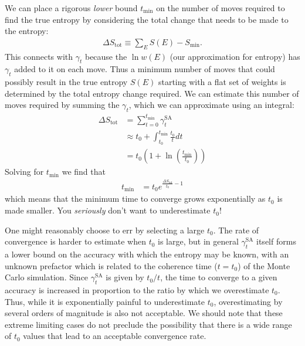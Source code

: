 \documentclass[letterpaper,twocolumn,amsmath,amssymb,pre,aps,10pt]{revtex4-1}
\begin{document}
We can place a rigorous \emph{lower} bound $t_{\min}$ on the number of
moves required to find the true entropy by considering the total change
that needs to be made to the entropy:
\begin{align}
  \Delta S_{\text{tot}} \equiv \sum_E S(E) - S_{\min}.
\end{align}
This connects with $\gamma_t$ because the $\ln w(E)$ (our approximation for entropy)
has $\gamma_t$ added to it on each move.  Thus a minimum number of moves
that could possibly result in the true entropy $S(E)$ starting with a flat set of
weights is determined by the total entropy change required.  We can estimate
this number of moves required by summing the $\gamma_t$,
which we can approximate using an integral:
\begin{align}
   \Delta S_{\text{tot}} &= \sum_{t=0}^{t_{\min}} \gamma_t^{\text{SA}} \\
  &\approx t_0 + \int_{t_0}^{t_{\min}} \frac{t_0}{t}dt
  \\
  &= t_0\left(1 + \ln\left(\frac{t_{\min}}{t_0}\right)\right)
\end{align}
Solving for ${t_{\min}}$ we find that
\begin{align}
  {t_{\min}} &= t_0 e^{\frac{\Delta S_{\text{tot}}}{t_0} - 1}
\end{align}
which means that the minimum time to converge grows exponentially
as $t_0$ is made smaller.  You \emph{seriously} don't want to underestimate
$t_0$!

One might reasonably choose to err by selecting a large $t_0$. The rate of
convergence is harder to estimate when $t_0$ is large, but in general
$\gamma_t^{\text{SA}}$ itself forms a lower bound on the accuracy with which the
entropy may be known, with an unknown prefactor which is related to the
coherence time ($t = t_0$) of the Monte Carlo simulation.  Since
$\gamma_t^{\text{SA}}$ is given by $t_0/t$, the time to converge to a given
accuracy is increased in proportion to the ratio by which we overestimate $t_0$.
Thus, while it is exponentially painful to underestimate $t_0$, overestimating
by several orders of magnitude is also not acceptable.  We should note that
these extreme limiting cases do not preclude the possibility that there is a
wide range of $t_0$ values that lead to an acceptable convergence rate.
\end{document}
